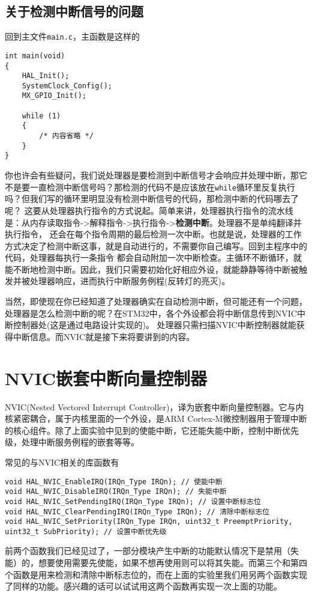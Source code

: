 \subsection{关于检测中断信号的问题}
回到主文件\verb|main.c|，主函数是这样的
\begin{lstlisting}
int main(void) 
{
    HAL_Init();
    SystemClock_Config();
    MX_GPIO_Init();

    while (1)
    {
        /* 内容省略 */
    }
}
\end{lstlisting}
你也许会有些疑问，我们说处理器是要检测到中断信号才会响应并处理中断，那它不是要一直检测中断信号吗？那检测的代码不是应该放在\verb|while|循环里反复执行吗？但我们写的循环里明显没有检测中断信号的代码，那检测中断的代码哪去了呢？
这要从处理器执行指令的方式说起。简单来讲，处理器执行指令的流水线是：从内存读取指令->解释指令->执行指令->{\bf 检测中断}。处理器不是单纯翻译并执行指令，
还会在每个指令周期的最后检测一次中断。也就是说，处理器的工作方式决定了检测中断这事，就是自动进行的，不需要你自己编写。回到主程序中的代码，处理器每执行一条指令
都会自动附加一次中断检查。主循环不断循环，就能不断地检测中断。因此，我们只需要初始化好相应外设，就能静静等待中断被触发并被处理器响应，进而执行中断服务例程(反转灯的亮灭)。

当然，即使现在你已经知道了处理器确实在自动检测中断，但可能还有一个问题，处理器是怎么检测中断的呢？在STM32中，各个外设都会将中断信息传到NVIC中断控制器处(这是通过电路设计实现的)。
处理器只需扫描NVIC中断控制器就能获得中断信息。而NVIC就是接下来将要讲到的内容。

\section{NVIC嵌套中断向量控制器}
NVIC(Nested Vectored Interrupt Controller)，译为嵌套中断向量控制器。它与内核紧密耦合，属于内核里面的一个外设，是ARM Cortex-M微控制器用于管理中断的核心组件。除了上面实验中见到的使能中断，它还能失能中断，控制中断优先级，处理中断服务例程的嵌套等等。

常见的与NVIC相关的库函数有
\begin{lstlisting}
void HAL_NVIC_EnableIRQ(IRQn_Type IRQn); // 使能中断
void HAL_NVIC_DisableIRQ(IRQn_Type IRQn); // 失能中断
void HAL_NVIC_SetPendingIRQ(IRQn_Type IRQn); // 设置中断标志位
void HAL_NVIC_ClearPendingIRQ(IRQn_Type IRQn); // 清除中断标志位
void HAL_NVIC_SetPriority(IRQn_Type IRQn, uint32_t PreemptPriority, uint32_t SubPriority); // 设置中断优先级
\end{lstlisting}
前两个函数我们已经见过了，一部分模块产生中断的功能默认情况下是禁用（失能）的，想要使用需要先使能，如果不想再使用则可以将其失能。而第三个和第四个函数是用来检测和清除中断标志位的，而在上面的实验里我们用另两个函数实现了同样的功能。感兴趣的话可以试试用这两个函数再实现一次上面的功能。

